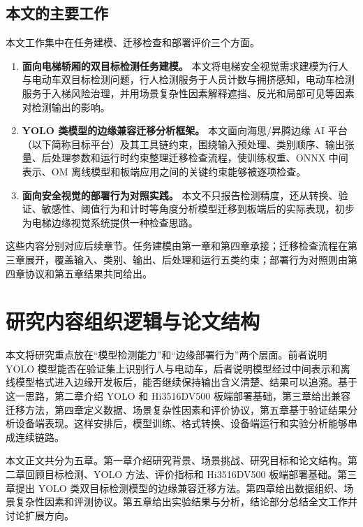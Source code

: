 \subsection{本文的主要工作}

本文工作集中在任务建模、迁移检查和部署评价三个方面。

\begin{enumerate}
    \item \textbf{面向电梯轿厢的双目标检测任务建模。} 本文将电梯安全视觉需求建模为行人与电动车双目标检测问题，行人检测服务于人员计数与拥挤感知，电动车检测服务于入梯风险治理，并用场景复杂性因素解释遮挡、反光和局部可见等因素对检测输出的影响。
    \item \textbf{YOLO 类模型的边缘兼容迁移分析框架。} 本文面向海思/昇腾边缘 AI 平台（以下简称目标平台）及其工具链约束，围绕输入预处理、类别顺序、输出张量、后处理参数和运行时约束整理迁移检查流程，使训练权重、ONNX 中间表示、OM 离线模型和板端应用之间的关键约束能够被逐项检查。
    \item \textbf{面向安全视觉的部署行为对照实践。} 本文不只报告检测精度，还从转换、验证、敏感性、阈值行为和计时等角度分析模型迁移到板端后的实际表现，初步为电梯边缘视觉系统提供一种检查思路。
\end{enumerate}

这些内容分别对应后续章节。任务建模由第一章和第四章承接；迁移检查流程在第三章展开，覆盖输入、类别、输出、后处理和运行五类约束；部署行为对照则由第四章协议和第五章结果共同给出。

\section{研究内容组织逻辑与论文结构}

本文将研究重点放在“模型检测能力”和“边缘部署行为”两个层面。前者说明 YOLO 模型能否在验证集上识别行人与电动车，后者说明模型经过中间表示和离线模型格式进入边缘开发板后，能否继续保持输出含义清楚、结果可以追溯。基于这一思路，第二章介绍 YOLO 和 Hi3516DV500 板端部署基础，第三章给出兼容迁移方法，第四章定义数据、场景复杂性因素和评价协议，第五章基于验证结果分析设备端表现。这样安排后，模型训练、格式转换、设备端运行和实验分析能够串成连续链路。

本文正文共分为五章。第一章介绍研究背景、场景挑战、研究目标和论文结构。第二章回顾目标检测、YOLO 方法、评价指标和 Hi3516DV500 板端部署基础。第三章提出 YOLO 类双目标检测模型的边缘兼容迁移方法。第四章给出数据组织、场景复杂性因素和评测协议。第五章给出实验结果与分析，结论部分总结全文工作并讨论扩展方向。
